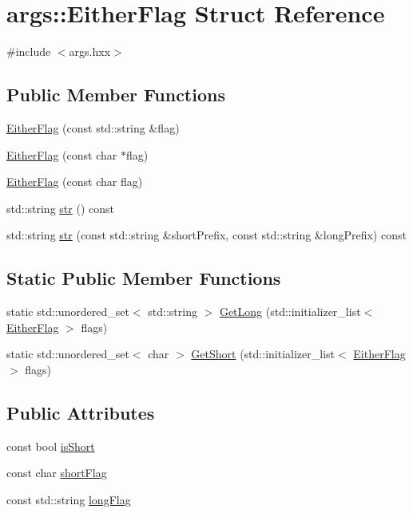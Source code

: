 \hypertarget{structargs_1_1_either_flag}{}\section{args\+:\+:Either\+Flag Struct Reference}
\label{structargs_1_1_either_flag}


{\ttfamily \#include $<$args.\+hxx$>$}

\subsection*{Public Member Functions}
\begin{DoxyCompactItemize}
\item 
\hyperlink{structargs_1_1_either_flag_a25a55dc23248b1862616ee6d405d1cbf}{Either\+Flag} (const std\+::string \&flag)
\item 
\hyperlink{structargs_1_1_either_flag_ac1261a33bb7ff7b84b713bcd1b820cdc}{Either\+Flag} (const char $\ast$flag)
\item 
\hyperlink{structargs_1_1_either_flag_a31cca668129ae2921fbed0b5e92a8603}{Either\+Flag} (const char flag)
\item 
std\+::string \hyperlink{structargs_1_1_either_flag_a5a758d897d6bc46aac191025cdeba164}{str} () const
\item 
std\+::string \hyperlink{structargs_1_1_either_flag_ad10840d40ae21e3d14daa02db4c2e32d}{str} (const std\+::string \&short\+Prefix, const std\+::string \&long\+Prefix) const
\end{DoxyCompactItemize}
\subsection*{Static Public Member Functions}
\begin{DoxyCompactItemize}
\item 
static std\+::unordered\+\_\+set$<$ std\+::string $>$ \hyperlink{structargs_1_1_either_flag_adfbd76246674351b77adadb99c1f961e}{Get\+Long} (std\+::initializer\+\_\+list$<$ \hyperlink{structargs_1_1_either_flag}{Either\+Flag} $>$ flags)
\item 
static std\+::unordered\+\_\+set$<$ char $>$ \hyperlink{structargs_1_1_either_flag_ae08b6f663ad7f00b441443a2376411e9}{Get\+Short} (std\+::initializer\+\_\+list$<$ \hyperlink{structargs_1_1_either_flag}{Either\+Flag} $>$ flags)
\end{DoxyCompactItemize}
\subsection*{Public Attributes}
\begin{DoxyCompactItemize}
\item 
const bool \hyperlink{structargs_1_1_either_flag_afada1f6945d0f18233f9fe1466e94137}{is\+Short}
\item 
const char \hyperlink{structargs_1_1_either_flag_a27c44f6c6d1fbd96005a3d293ff2d4e2}{short\+Flag}
\item 
const std\+::string \hyperlink{structargs_1_1_either_flag_a8ae948a28b5919e82d2bbcfc999c5dda}{long\+Flag}
\end{DoxyCompactItemize}


